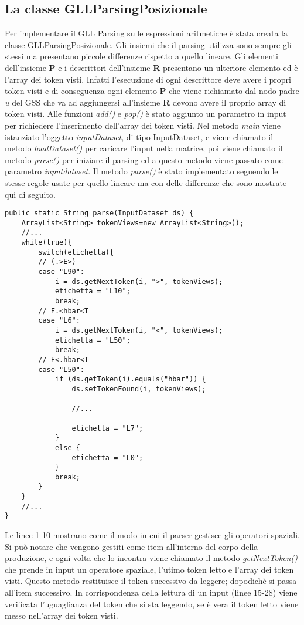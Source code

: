 \subsection{La classe GLLParsingPosizionale}
Per implementare il GLL Parsing sulle espressioni aritmetiche è stata creata la classe GLLParsingPosizionale. Gli insiemi che il parsing utilizza sono sempre gli stessi ma presentano piccole differenze rispetto a quello lineare. Gli elementi dell'insieme \textbf{P} e i descrittori dell'insieme \textbf{R} presentano un ulteriore elemento ed è l'array dei token visti. Infatti l'esecuzione di ogni descrittore deve avere i propri token visti e di conseguenza ogni elemento \textbf{P} che viene richiamato dal nodo padre \textit{u} del GSS che va ad aggiungersi all'insieme \textbf{R} devono avere il proprio array di token visti.  Alle funzioni \textit{add()} e \textit{pop()} è stato aggiunto un parametro in input per richiedere l'inserimento dell'array dei token visti. Nel metodo \textit{main} viene istanziato l'oggetto \textit{inputDataset}, di tipo InputDataset, e viene chiamato il metodo \textit{loadDataset()} per caricare l'input nella matrice, poi viene chiamato il metodo \textit{parse()} per iniziare il parsing ed a questo metodo viene passato come parametro \textit{inputdataset}. Il metodo \textit{parse()} è stato implementato seguendo le stesse regole usate per quello lineare ma con delle differenze che sono mostrate qui di seguito.
\begin{lstlisting}
public static String parse(InputDataset ds) {
	ArrayList<String> tokenViews=new ArrayList<String>();
	//...
	while(true){
		switch(etichetta){
		// (.>E>)
		case "L90":
			i = ds.getNextToken(i, ">", tokenViews);
			etichetta = "L10";
			break;
		// F.<hbar<T
		case "L6":
			i = ds.getNextToken(i, "<", tokenViews);
			etichetta = "L50";
			break;
		// F<.hbar<T
		case "L50":
			if (ds.getToken(i).equals("hbar")) {
				ds.setTokenFound(i, tokenViews);
			
				//...
			
				etichetta = "L7";
			} 
			else {
				etichetta = "L0";
			}
			break;
		}
	}
	//...
}
\end{lstlisting}
Le linee 1-10 mostrano come il modo in cui il parser gestisce gli operatori spaziali. Si può notare che vengono gestiti come item all'interno del corpo della produzione, e ogni volta che lo incontra viene chiamato il metodo \textit{getNextToken()} che prende in input un operatore spaziale, l'utimo token letto e l'array dei token visti. Questo metodo restituisce il token successivo da leggere; dopodichè si passa all'item successivo. In corrispondenza della lettura di un input (linee 15-28) viene verificata l'uguaglianza del token che si sta leggendo, se è vera il token letto viene messo nell'array dei token visti.
